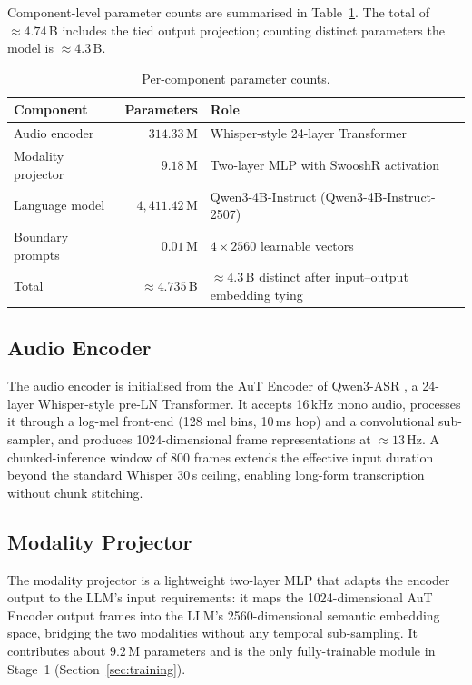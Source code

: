 Component-level parameter counts are summarised in
Table~\ref{tab:params}. The total of $\approx\!4.74$\,B includes the
tied output projection; counting distinct parameters the model is
$\approx\!4.3$\,B.

\begin{table}[t]
  \caption{Per-component parameter counts.}
  \label{tab:params}
  \centering
  \small
  \begin{tabular}{lrl}
    \toprule
    Component & Parameters & Role \\
    \midrule
    Audio encoder              & $314.33$\,M     & Whisper-style 24-layer Transformer \\
    Modality projector         & $9.18$\,M       & Two-layer MLP with SwooshR activation \\
    Language model             & $4{,}411.42$\,M & Qwen3-4B-Instruct (Qwen3-4B-Instruct-2507) \\
    Boundary prompts           & $0.01$\,M       & $4\!\times\!2560$ learnable vectors \\
    \midrule
    Total                      & $\approx 4.735$\,B & $\approx 4.3$\,B distinct after input--output embedding tying \\
    \bottomrule
  \end{tabular}
\end{table}

\subsection{Audio Encoder}
\label{subsec:audio-encoder}

The audio encoder is initialised from the AuT Encoder of Qwen3-ASR
\cite{qwen2025qwen3asr}, a 24-layer Whisper-style pre-LN Transformer.
It accepts 16\,kHz mono audio, processes it through a log-mel front-end
(128 mel bins, 10\,ms hop) and a convolutional sub-sampler, and
produces 1024-dimensional frame representations at ${\approx}13$\,Hz.
A chunked-inference window of 800 frames extends the effective input
duration beyond the standard Whisper 30\,s ceiling, enabling long-form
transcription without chunk stitching.

\subsection{Modality Projector}
\label{subsec:projector}

The modality projector is a lightweight two-layer MLP that adapts the
encoder output to the LLM's input requirements: it maps the
1024-dimensional AuT Encoder output frames into the LLM's
2560-dimensional semantic embedding space, bridging the two modalities
without any temporal sub-sampling. It contributes about $9.2$\,M
parameters and is the only fully-trainable module in Stage~1
(Section~\ref{sec:training}).

